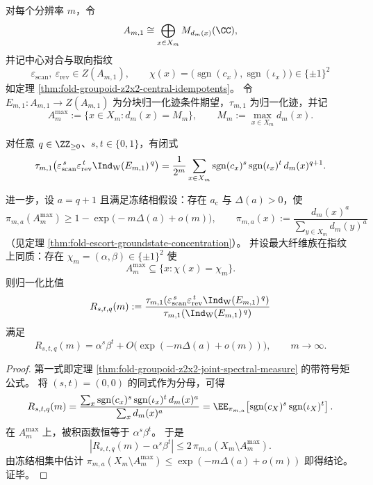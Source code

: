 \begin{theorem}\label{thm:conclusion-signed-watatani-moments-read-chi}
对每个分辨率 \(m\)，令
\[
A_{m,1}\cong\bigoplus_{x\in X_m}M_{d_m(x)}(\CC),
\]
并记中心对合与取向指纹
\[
\varepsilon_{\mathrm{scan}},\ \varepsilon_{\mathrm{rev}}\in Z(A_{m,1}),
\qquad
\chi(x)=\bigl(\operatorname{sgn}(c_x),\operatorname{sgn}(\iota_x)\bigr)\in\{\pm1\}^2
\]
如定理 \ref{thm:fold-groupoid-z2x2-central-idempotents}。
令 \(E_{m,1}:A_{m,1}\to Z(A_{m,1})\) 为分块归一化迹条件期望，\(\tau_{m,1}\) 为归一化迹，并记
\[
A_m^{\max}:=\{x\in X_m:d_m(x)=M_m\},
\qquad
M_m:=\max_{x\in X_m}d_m(x).
\]

对任意 \(q\in\ZZ_{\ge 0}\)、\(s,t\in\{0,1\}\)，有闭式
\[
\tau_{m,1}\!\left(\varepsilon_{\mathrm{scan}}^{\,s}\varepsilon_{\mathrm{rev}}^{\,t}\Ind_{\mathrm W}(E_{m,1})^{\,q}\right)
=\frac1{2^m}\sum_{x\in X_m}\operatorname{sgn}(c_x)^s\operatorname{sgn}(\iota_x)^t\,d_m(x)^{q+1}.
\]

进一步，设 \(a=q+1\) 且满足冻结相假设：存在 \(a_{\mathrm c}\) 与 \(\Delta(a)>0\)，使
\[
\pi_{m,a}(A_m^{\max})\ge 1-\exp\!\bigl(-m\Delta(a)+o(m)\bigr),
\qquad
\pi_{m,a}(x):=\frac{d_m(x)^a}{\sum_{y\in X_m}d_m(y)^a}
\]
（见定理 \ref{thm:fold-escort-groundstate-concentration}）。
并设最大纤维族在指纹上同质：存在 \(\chi_m=(\alpha,\beta)\in\{\pm1\}^2\) 使
\[
A_m^{\max}\subseteq\{x:\chi(x)=\chi_m\}.
\]
则归一化比值
\[
R_{s,t,q}(m):=
\frac{\tau_{m,1}\!\left(\varepsilon_{\mathrm{scan}}^{\,s}\varepsilon_{\mathrm{rev}}^{\,t}\Ind_{\mathrm W}(E_{m,1})^{\,q}\right)}
{\tau_{m,1}\!\left(\Ind_{\mathrm W}(E_{m,1})^{\,q}\right)}
\]
满足
\[
R_{s,t,q}(m)=\alpha^s\beta^t+O\!\bigl(\exp(-m\Delta(a)+o(m))\bigr),
\qquad m\to\infty.
\]
\end{theorem}
\begin{proof}
第一式即定理 \ref{thm:fold-groupoid-z2x2-joint-spectral-measure} 的带符号矩公式。
将 \((s,t)=(0,0)\) 的同式作为分母，可得
\[
R_{s,t,q}(m)
=\frac{\sum_x \operatorname{sgn}(c_x)^s\operatorname{sgn}(\iota_x)^t\,d_m(x)^a}
{\sum_x d_m(x)^a}
=\EE_{\pi_{m,a}}\!\left[\operatorname{sgn}(c_X)^s\operatorname{sgn}(\iota_X)^t\right].
\]
在 \(A_m^{\max}\) 上，被积函数恒等于 \(\alpha^s\beta^t\)。
于是
\[
\left|R_{s,t,q}(m)-\alpha^s\beta^t\right|
\le
2\,\pi_{m,a}(X_m\setminus A_m^{\max}).
\]
由冻结相集中估计
\(
\pi_{m,a}(X_m\setminus A_m^{\max})
\le \exp(-m\Delta(a)+o(m))
\)
即得结论。证毕。
\end{proof}

